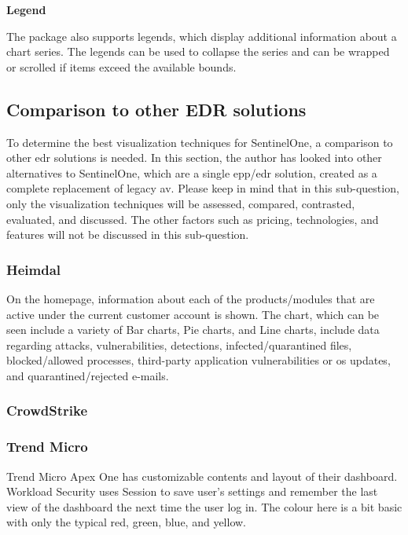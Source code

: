 \begin{multicols}{2}
      \textbf{Legend}

      The package also supports legends, which display additional information about a chart series. The legends
      can be used to collapse the series and can be wrapped or scrolled if items exceed the available bounds.

      \subsection{Comparison to other EDR solutions}
      To determine the best visualization techniques for SentinelOne, a comparison to other \acrshort{edr}
      solutions is needed. In this section, the author has looked into other alternatives to SentinelOne, which are
      a single \acrshort{epp}/\acrshort{edr} solution, created as a complete replacement of legacy \acrshort{av}.
      Please keep in mind that in this sub-question, only the visualization techniques will be assessed, compared,
      contrasted, evaluated, and discussed. The other factors such as pricing, technologies, and features will not
      be discussed in this sub-question.

      \subsubsection{Heimdal\textregistered}

      On the homepage, information about each of the products/modules that are active under the current customer
      account is shown. The chart, which can be seen include a variety of Bar charts, Pie charts, and Line charts,
      include data regarding attacks, vulnerabilities, detections, infected/quarantined files, blocked/allowed
      processes, third-party application vulnerabilities or \acrshort{os} updates, and quarantined/rejected e-mails.

      \subsubsection{CrowdStrike}


      \subsubsection{Trend Micro} %
      Trend Micro Apex One has customizable contents and layout of their dashboard. Workload Security uses Session
      to save user's settings and remember the last view of the dashboard the next time the user log in.
      The colour here is a bit basic with only the typical
      red, green, blue, and yellow.


\end{multicols}
